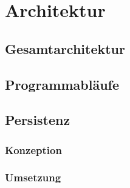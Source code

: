 \documentclass[12pt, oneside, a4paper]{article}		%
\begin{document}
\section{Architektur}

\subsection{Gesamtarchitektur}


\subsection{Programmabläufe}
\blindtext

\subsection{Persistenz}
\blindtext

\subsubsection{Konzeption}
\blindtext

\subsubsection{Umsetzung}
\blindtext
\end{document}
